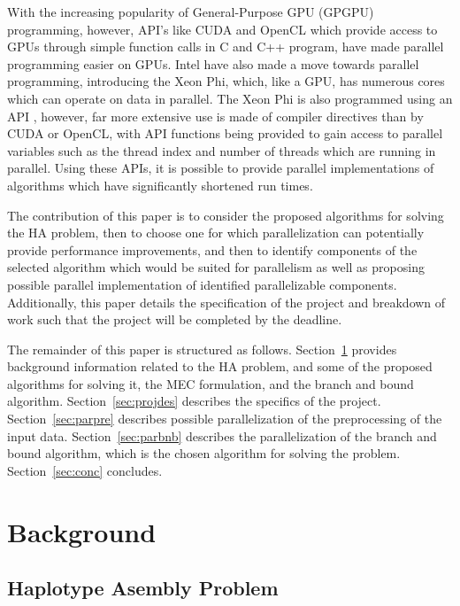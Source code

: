 \documentclass[10pt,a4paer,twocolumn]{article}
\begin{document}
With the increasing popularity of General-Purpose GPU (GPGPU) programming, however, API's like CUDA
\cite{nvidia:2015} and OpenCL \cite{khronos:2015}
which provide access to GPUs through simple function calls in C and C++ program, have made parallel programming
easier on GPUs. Intel have also made a move towards parallel programming, introducing the Xeon Phi, which, like 
a GPU, has numerous cores which can operate on data in parallel. The Xeon Phi is also programmed using an API 
\cite{intel:2013}, however, far more extensive use is made of compiler directives than by CUDA or OpenCL, 
with API functions being provided to gain access to parallel variables such as the thread index and number of 
threads which are running in parallel. Using these APIs, it is possible to provide parallel implementations of
algorithms which have significantly shortened run times.

The contribution of this paper is to consider the proposed algorithms for solving the HA problem, then to
choose one for which parallelization can potentially provide performance improvements, and then to identify 
components of the selected algorithm which would be suited for parallelism as well as proposing possible 
parallel implementation of identified parallelizable components. Additionally, this paper details the
specification of the project and breakdown of work such that the project will be completed by the deadline.

The remainder of this paper is structured as follows. Section~\ref{sec:bground} provides background
information related to the HA problem, and some of the proposed algorithms for solving it, the MEC
formulation, and the branch and bound algorithm. Section~\ref{sec:projdes} describes the specifics of the
project. Section~\ref{sec:parpre} describes possible parallelization of the preprocessing of the input data. 
Section~\ref{sec:parbnb} describes the parallelization of the branch and bound algorithm, which is the chosen
algorithm for solving the problem. Section~\ref{sec:conc} concludes.


\section{Background} \label{sec:bground}

\subsection{Haplotype Asembly Problem} \label{sec:hap}
\end{document}
